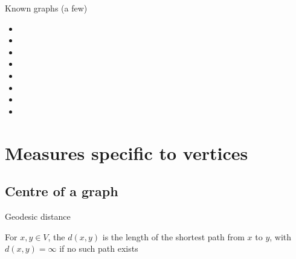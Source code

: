 \documentclass[aspectratio=169]{beamer}\usepackage[]{graphicx}\usepackage[]{xcolor}
\begin{document}
\begin{frame}{Known graphs (a few)}
	\begin{itemize}
		\item {}
		\item {}
		\item {}
		\item {}
		\item {}
		\item {}
		\item {}
		\item {}
	\end{itemize}
\end{frame}


\section{Measures specific to vertices}


\subsection{Centre of a graph}


\begin{frame}{Geodesic distance}
\begin{definition}
For $x,y\in V$, the  $d(x,y)$ is the length of the shortest path from $x$ to $y$, with $d(x,y)=\infty$ if no such path exists
\end{definition}
\end{frame}
\end{document}
